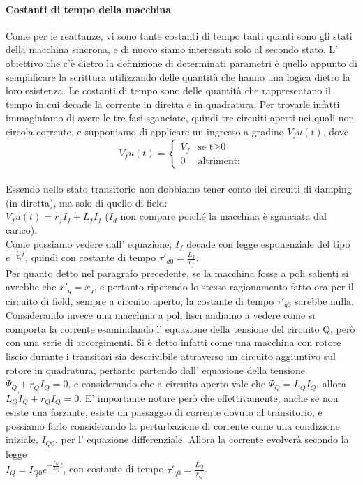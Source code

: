 \documentclass[Lau,noexaminfo]{sapthesis}
\begin{document}
	\paragraph{Costanti di tempo della macchina}
	Come per le reattanze, vi sono tante costanti di tempo tanti quanti sono gli stati della macchina sincrona, e di nuovo siamo interessati solo al secondo stato. L' obiettivo che c'è dietro la definizione di determinati parametri è quello appunto di semplificare la scrittura utilizzando delle quantità che hanno una logica dietro la loro esistenza. Le costanti di tempo sono delle quantità che rappresentano il tempo in cui decade la corrente in diretta e in quadratura. Per trovarle infatti immaginiamo di avere le tre fasi sganciate, quindi tre circuiti aperti nei quali non circola corrente, e supponiamo di applicare un ingresso a gradino $V_fu(t)$, dove\\
	\[
	V_fu(t)=
	\begin{cases}
	V_f	& \text{se t$\ge$0}\\
	0	& \text{altrimenti}
	\end{cases}
	\]\\ Essendo nello stato transitorio non dobbiamo tener conto dei circuiti di damping (in diretta), ma solo di quello di field:\\
	$V_fu(t)=r_fI_f+L_f\dot{I}_f$ ($I_d$ non compare poiché la macchina è sganciata dal carico).\\
	Come possiamo vedere dall' equazione, $I_f$ decade con legge esponenziale del tipo $e^{-\frac{r_f}{L_f}t}$, quindi con costante di tempo $\tau'_{d0}=\frac{L_f}{r_f}$.\\
	Per quanto detto nel paragrafo precedente, se la macchina fosse a poli salienti si avrebbe che $x'_q=x_q$, e pertanto ripetendo lo stesso ragionamento fatto ora per il circuito di field, sempre a circuito aperto, la costante di tempo $\tau'_{q0}$ sarebbe nulla. Considerando invece una macchina a poli lisci andiamo a vedere come si comporta la corrente esamindando l' equazione della tensione del circuito Q, però con una serie di accorgimenti. Si è detto infatti come una macchina con rotore liscio durante i transitori sia descrivibile attraverso un circuito aggiuntivo sul rotore in quadratura, pertanto partendo dall' equazione della tensione $\dot{\Psi}_Q+r_QI_Q=0$, e considerando che a circuito aperto vale che $\Psi_Q=L_QI_Q$,
	allora $L_Q\dot{I}_Q+r_QI_Q=0$. E' importante notare però che effettivamente, anche se non esiste una forzante, esiste un passaggio di corrente dovuto al transitorio, e possiamo farlo considerando la perturbazione di corrente come una condizione iniziale, $I_{Q0}$, per l' equazione differenziale. Allora la corrente evolverà secondo la legge\\
	$I_Q=I_{Q0}e^{-\frac{r_Q}{L_Q}t}$, con costante di tempo $\tau'_{q0}=\frac{L_Q}{r_Q}$.
	
\end{document}
